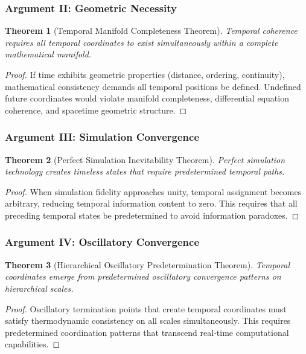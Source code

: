 \documentclass[12pt,a4paper]{article}
\newtheorem{theorem}{Theorem}[section]
\begin{document}
\subsubsection{Argument II: Geometric Necessity}

\begin{theorem}[Temporal Manifold Completeness Theorem]
Temporal coherence requires all temporal coordinates to exist simultaneously within a complete mathematical manifold.
\end{theorem}

\begin{proof}
If time exhibits geometric properties (distance, ordering, continuity), mathematical consistency demands all temporal positions be defined. Undefined future coordinates would violate manifold completeness, differential equation coherence, and spacetime geometric structure.
\end{proof}

\subsubsection{Argument III: Simulation Convergence}

\begin{theorem}[Perfect Simulation Inevitability Theorem]
Perfect simulation technology creates timeless states that require predetermined temporal paths.
\end{theorem}

\begin{proof}
When simulation fidelity approaches unity, temporal assignment becomes arbitrary, reducing temporal information content to zero. This requires that all preceding temporal states be predetermined to avoid information paradoxes.
\end{proof}

\subsubsection{Argument IV: Oscillatory Convergence}

\begin{theorem}[Hierarchical Oscillatory Predetermination Theorem]
Temporal coordinates emerge from predetermined oscillatory convergence patterns on hierarchical scales.
\end{theorem}

\begin{proof}
Oscillatory termination points that create temporal coordinates must satisfy thermodynamic consistency on all scales simultaneously. This requires predetermined coordination patterns that transcend real-time computational capabilities.
\end{proof}
\end{document}
